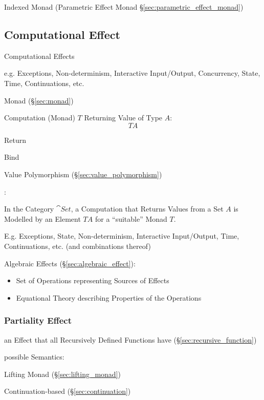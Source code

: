 Indexed Monad (Parametric Effect Monad
\S\ref{sec:parametric_effect_monad})



\subsection{Computational Effect}\label{sec:computational_effect}

Computational Effects

e.g. Exceptions, Non-determinism, Interactive Input/Output,
Concurrency, State, Time, Continuations, etc. \cite{plotkin-pretnar09}

Monad (\S\ref{sec:monad})

Computation (Monad) $T$ Returning Value of Type $A$:
\[
  T A
\]

Return

Bind

Value Polymorphism (\S\ref{sec:value_polymorphism})

\cite{plotkin-pretnar13}:

In the Category $\cat{Set}$, a Computation that Returns Values from a
Set $A$ is Modelled by an Element $T A$ for a ``suitable'' Monad $T$.

E.g. Exceptions, State, Non-determinism, Interactive Input/Output,
Time, Continuations, etc. (and combinations thereof)

Algebraic Effects (\S\ref{sec:algebraic_effect}):
\begin{itemize}
  \item Set of Operations representing Sources of Effects
  \item Equational Theory describing Properties of the Operations
\end{itemize}



\subsubsection{Partiality Effect}\label{sec:partiality_effect}

an Effect that all Recursively Defined Functions have
(\S\ref{sec:recursive_function})

possible Semantics:

Lifting Monad (\S\ref{sec:lifting_monad})

Continuation-based (\S\ref{sec:continuation})



